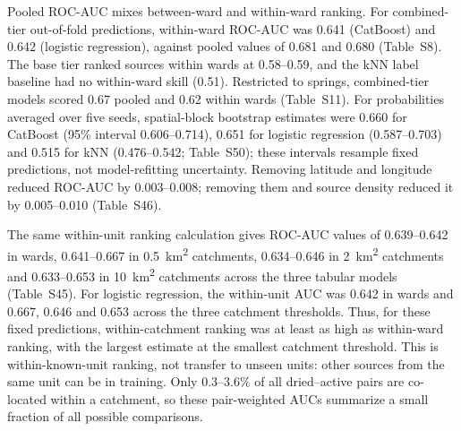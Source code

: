 \documentclass[preprint,12pt,authoryear]{elsarticle}
\newcommand{\auc}{ROC-AUC}
\begin{document}
Pooled \auc{} mixes between-ward and within-ward ranking. For combined-tier out-of-fold predictions, within-ward \auc{} was 0.641 (CatBoost) and 0.642 (logistic regression), against pooled values of 0.681 and 0.680 (Table~S8). The base tier ranked sources within wards at 0.58--0.59, and the kNN label baseline had no within-ward skill (0.51). Restricted to springs, combined-tier models scored 0.67 pooled and 0.62 within wards (Table~S11). For probabilities averaged over five seeds, spatial-block bootstrap estimates were 0.660 for CatBoost (95\% interval 0.606--0.714), 0.651 for logistic regression (0.587--0.703) and 0.515 for kNN (0.476--0.542; Table~S50); these intervals resample fixed predictions, not model-refitting uncertainty. Removing latitude and longitude reduced ROC-AUC by 0.003--0.008; removing them and source density reduced it by 0.005--0.010 (Table~S46).

The same within-unit ranking calculation gives \auc{} values of 0.639--0.642 in wards, 0.641--0.667 in \SI{0.5}{\kilo\metre\squared} catchments, 0.634--0.646 in \SI{2}{\kilo\metre\squared} catchments and 0.633--0.653 in \SI{10}{\kilo\metre\squared} catchments across the three tabular models (Table~S45). For logistic regression, the within-unit AUC was 0.642 in wards and 0.667, 0.646 and 0.653 across the three catchment thresholds. Thus, for these fixed predictions, within-catchment ranking was at least as high as within-ward ranking, with the largest estimate at the smallest catchment threshold. This is within-known-unit ranking, not transfer to unseen units: other sources from the same unit can be in training. Only 0.3--3.6\% of all dried--active pairs are co-located within a catchment, so these pair-weighted AUCs summarize a small fraction of all possible comparisons.
\end{document}
